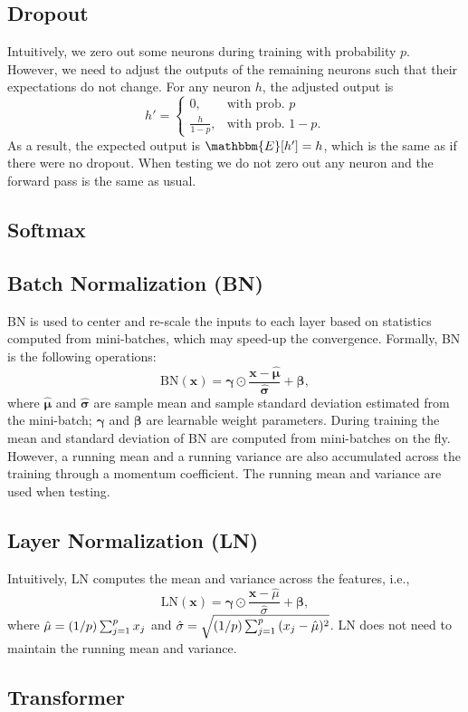             
\subsection{Dropout}
    Intuitively, we zero out some neurons during training with probability $p$.
    However, we need to adjust the outputs of the remaining neurons such that their expectations do not change.
    For any neuron $h$, the adjusted output is
        \begin{equation}
            h' = \begin{cases}
                    0, & \text{with prob. $p$} \\
                    \frac{h}{1-p}, & \text{with prob. $1-p$}.
                 \end{cases}
        \end{equation}
    As a result, the expected output is $\mathbbm{E}[h'] = h$, which is the same as if there were no dropout.
    When testing we do not zero out any neuron and the forward pass is the same as usual.

\subsection{Softmax}
    
    
\subsection{Batch Normalization (BN)}
    BN is used to center and re-scale the inputs to each layer based on statistics computed from mini-batches, which may speed-up the convergence.
    Formally, BN is the following operations:
        \begin{equation}
            \text{BN}(\bm{x}) = \bm{\gamma} \odot \frac{\bm{x} - \hat{\bm{\mu}} }{\hat{\bm{\sigma}}} + \bm{\beta},
        \end{equation}
    where $\hat{\bm{\mu}}$ and $\hat{\bm{\sigma}}$ are sample mean and sample standard deviation estimated from the mini-batch; $\bm{\gamma}$ and $\bm{\beta}$ are learnable weight parameters.
    During training the mean and standard deviation of BN are computed from mini-batches on the fly. 
    However, a running mean and a running variance are also accumulated across the training through a momentum coefficient. 
    The running mean and variance are used when testing. 


\subsection{Layer Normalization (LN)}
    Intuitively, LN computes the mean and variance across the features, i.e., 
        \begin{equation}
            \text{LN}(\bm{x}) = \bm{\gamma} \odot \frac{\bm{x} - \hat{\mu} }{\hat{\sigma}} + \bm{\beta},
        \end{equation}
    where $\hat{\mu} = (1/p) \sum_{j=1}^{p}{x_j}$ and $\hat{\sigma} = \sqrt{(1/p)\sum_{j=1}^{p}{(x_j - \hat{\mu})^2} }$.
    LN does not need to maintain the running mean and variance. 

\subsection{Transformer}
    